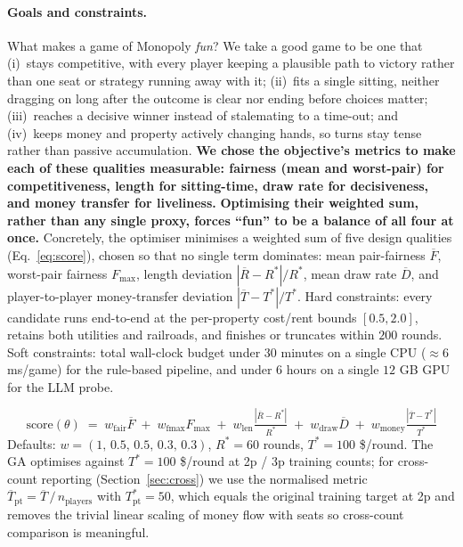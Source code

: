 \documentclass[10pt]{article}
\begin{document}
\paragraph{Goals and constraints.} What makes a game of Monopoly
\emph{fun}? We take a good game to be one that (i)~stays competitive,
with every player keeping a plausible path to victory rather than one
seat or strategy running away with it; (ii)~fits a single sitting,
neither dragging on long after the outcome is clear nor ending before
choices matter; (iii)~reaches a decisive winner instead of stalemating
to a time-out; and (iv)~keeps money and property actively changing
hands, so turns stay tense rather than passive accumulation. \textbf{We chose
the objective's metrics to make each of these qualities measurable:
fairness (mean and worst-pair) for competitiveness, length for
sitting-time, draw rate for decisiveness, and money transfer for
liveliness.} \textbf{Optimising their weighted sum, rather than any single
proxy, forces ``fun'' to be a balance of all four at once.}
Concretely, the optimiser minimises a weighted
sum of five design qualities (Eq.~\ref{eq:score}), chosen so that no
single term dominates: mean pair-fairness $\overline{F}$, worst-pair
fairness $F_{\max}$, length deviation $|\overline{R}-R^{*}|/R^{*}$,
mean draw rate $\overline{D}$, and player-to-player money-transfer
deviation $|\overline{T}-T^{*}|/T^{*}$. Hard constraints: every
candidate runs end-to-end at the per-property cost/rent bounds
$[0.5, 2.0]$, retains both utilities and railroads, and finishes or
truncates within $200$ rounds. Soft constraints: total wall-clock
budget under $30$ minutes on a single CPU ($\approx 6$ ms/game) for the
rule-based pipeline, and under $6$ hours on a single $12$ GB GPU for
the LLM probe.

\begin{equation}\label{eq:score}
\text{score}(\theta) \;=\;
   w_{\text{fair}} \overline{F} \;+\;
   w_{\text{fmax}} F_{\max} \;+\;
   w_{\text{len}}  \tfrac{|\overline{R}-R^{*}|}{R^{*}} \;+\;
   w_{\text{draw}}\overline{D} \;+\;
   w_{\text{money}}\tfrac{|\overline{T}-T^{*}|}{T^{*}}
\end{equation}
Defaults: $w=(1,\,0.5,\,0.5,\,0.3,\,0.3)$, $R^{*}=60$ rounds,
$T^{*}=100$ \$/round. The GA optimises against $T^{*}=100$ \$/round
at 2p / 3p training counts; for cross-count reporting
(Section~\ref{sec:cross}) we use the normalised metric
$\overline{T}_{\text{pt}} = \overline{T}\,/\,n_\text{players}$ with
$T^{*}_{\text{pt}} = 50$, which equals the original training target
at 2p and removes the trivial linear scaling of money flow with
seats so cross-count comparison is meaningful.
\end{document}
